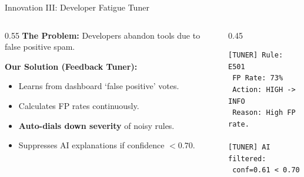 \documentclass[aspectratio=169, 10pt]{beamer}
\begin{document}
\begin{frame}[fragile]{Innovation III: Developer Fatigue Tuner}
  \begin{columns}[T]
    \begin{column}{0.55\textwidth}
      \textbf{The Problem:}
      Developers abandon tools due to false positive spam.

      \vspace{1em}
      \textbf{Our Solution (Feedback Tuner):}
      \begin{itemize}\setlength\itemsep{0.5em}
        \item Learns from dashboard `false positive' votes.
        \item Calculates FP rates continuously.
        \item \textbf{Auto-dials down severity} of noisy rules.
        \item Suppresses AI explanations if confidence $< 0.70$.
      \end{itemize}
    \end{column}
    \begin{column}{0.45\textwidth}
      \begin{tcolorbox}[colback=acrNavy,title={\textbf{Live Adaptation}},coltext=white]
\begin{lstlisting}[style=shellstyle]
[TUNER] Rule: E501
 FP Rate: 73%
 Action: HIGH -> INFO
 Reason: High FP rate.

[TUNER] AI filtered:
 conf=0.61 < 0.70
\end{lstlisting}
      \end{tcolorbox}
    \end{column}
  \end{columns}
\end{frame}
\end{document}
